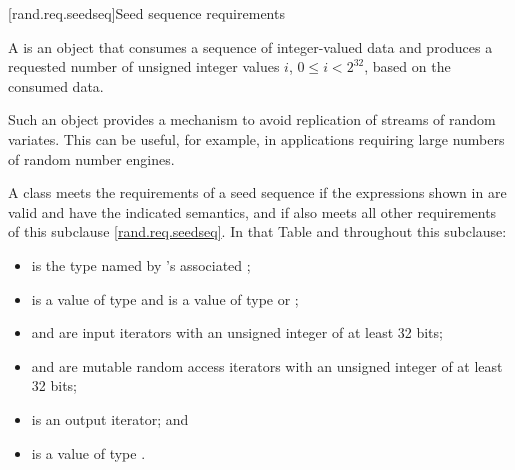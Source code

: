 
[rand.req.seedseq]{Seed sequence requirements}%
%

\pnum
 A 
 is an object
 that consumes a sequence
 of integer-valued data
 and produces a requested number
 of unsigned integer values $i$, $0 \le i < 2^{32}$,
 based on the consumed data.
\begin{note}
 Such an object provides a mechanism
 to avoid replication of streams of random variates.
 This can be useful, for example, in applications
 requiring large numbers of random number engines.
\end{note}

\pnum
A class 
meets the requirements
of a seed sequence
if the expressions shown
in 
are valid and have the indicated semantics,
and if  also meets all other requirements
of this subclause \ref{rand.req.seedseq}.
In that Table and throughout this subclause:
\begin{itemize}
  \item
     is the type named by
    's associated ;
  \item
     is a value of type 
    and
     is a value of type  or ;
  \item
     and  are input iterators
    with an unsigned integer  of at least 32 bits;
  \item
     and  are mutable random access iterators
    with an unsigned integer  of at least 32 bits;
  \item
     is an output iterator;
  and
  \item
     is a value of type .
\end{itemize}


